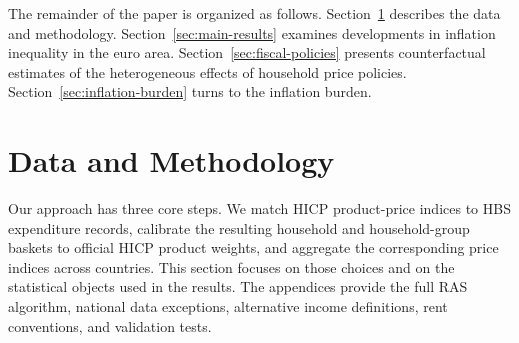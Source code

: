 \documentclass[11pt]{article}
\begin{document}






The remainder of the paper is organized as follows. Section~\ref{sec:data-methodology} describes the
data and methodology. Section~\ref{sec:main-results} examines developments in inflation inequality
in the euro area. Section~\ref{sec:fiscal-policies} presents counterfactual estimates of the heterogeneous
effects of household price policies. Section~\ref{sec:inflation-burden} turns to the inflation
burden.


\section{Data and Methodology}

\label{sec:data-methodology}

Our approach has three core steps. We match HICP product-price indices to HBS expenditure records,
calibrate the resulting household and household-group baskets to official HICP product weights, and
aggregate the corresponding price indices across countries. This section focuses on those choices
and on the statistical objects used in the results. The appendices provide the full RAS algorithm,
national data exceptions, alternative income definitions, rent conventions, and validation tests.
\end{document}
